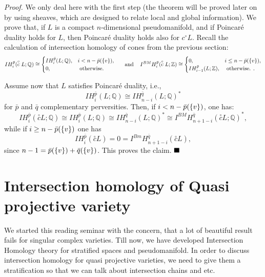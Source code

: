 \documentclass[11pt]{article}
\begin{document}
\noindent \textit{Proof.} We only deal here with the first step (the theorem will be proved later on by using sheaves, which are designed to relate local and global information). We prove that, if $L$ is a compact $n$-dimensional pseudomanifold, and if Poincaré duality holds for $L$, then Poincaré duality holds also for $c{ }^{\circ} L$. Recall the calculation of intersection homology of cones from the previous section:
$$
\begin{aligned}
& I H_i^{\bar{p}}(\stackrel{\circ}{c} L ; \mathbb{Q}) \cong \begin{cases}I H_i^{\bar{p}}(L ; \mathbb{Q}), & i<n-\bar{p}(\qty{v}), \\
0, & \text { otherwise. }\end{cases}
\end{aligned} \hspace*{0.3cm} \text{and } \hspace*{0.3cm} I^{B M} H_i^{\bar{p}}(\stackrel{\circ}{c} L ; \mathbb{Z}) \cong \begin{cases}0, & i \leq n-\bar{p}(\qty{v}), \\
    I H_{i-1}^{\bar{p}}(L ; \mathbb{Z}), & \text { otherwise. } .\end{cases}
$$

\noindent Assume now that $L$ satisfies Poincaré duality, i.e.,
$$
I H_i^{\bar{p}}(L ; \mathbb{Q}) \cong I H_{n-i}^{\bar{q}}(L ; \mathbb{Q})^{\ast}
$$
for $\bar{p}$ and $\bar{q}$ complementary perversities. Then, if $i<n-\bar{p}(\qty{v})$, one has:
$$
I H_i^{\bar{p}}(\stackrel{\circ}{c} L ; \mathbb{Q}) \cong I H_i^{\bar{p}}(L ; \mathbb{Q}) \cong I H_{n-i}^{\bar{q}}(L ; \mathbb{Q})^{\ast} \cong I^{BM}H_{n+1-i}^{\bar{q}}(\stackrel{\circ}{c} L ; \mathbb{Q})^{\ast},
$$
while if $i \geq n-\bar{p}(\qty{v})$ one has
$$
I H_i^{\bar{p}}(\stackrel{\circ}{c} L)=0=I^{Bm} H_{n+1-i}^{\bar{q}}(\stackrel{\circ}{c} L),
$$
since $n-1=\bar{p}(\qty{v})+\bar{q}(\qty{v})$. This proves the claim. $\hfill \blacksquare$

\section{Intersection homology of Quasi projective variety}

We started this reading seminar with the concern, that a lot of beautiful result fails for singular complex varieties. Till now, we have developed Intersection Homology theory for stratified spaces and pseudomanifold. In order to discuss intersection homology for quasi projective varieties, we need to give them a stratification so that we can talk about intersection chains and etc.  
\end{document}
